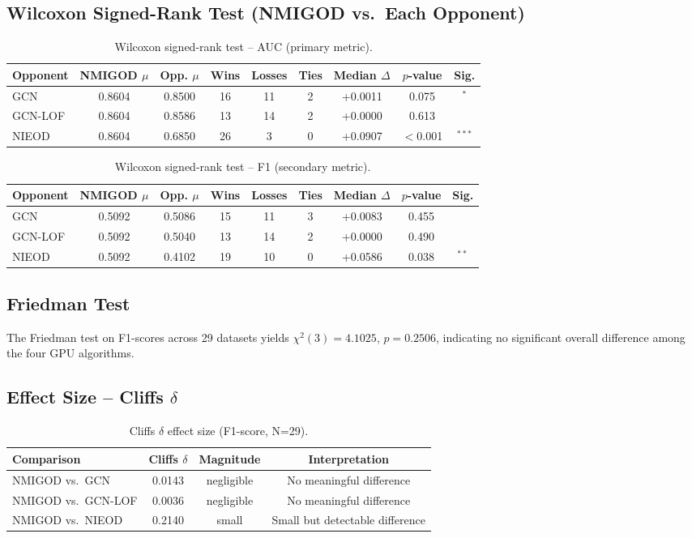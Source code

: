 \documentclass[11pt,a4paper]{article}
\begin{document}
\subsection{Wilcoxon Signed-Rank Test (NMIGOD vs.\ Each Opponent)}
\begin{table}[H]\centering\caption{Wilcoxon signed-rank test -- AUC (primary metric).}\label{tab:wilcoxon_auc}\small
\begin{tabular}{lcccccccc}
\toprule
Opponent & NMIGOD $\mu$ & Opp. $\mu$ & Wins & Losses & Ties & Median $\Delta$ & $p$-value & Sig. \\
\midrule
GCN & 0.8604 & 0.8500 & 16 & 11 & 2 & +0.0011 & 0.075 & $^{*}$ \\
GCN-LOF & 0.8604 & 0.8586 & 13 & 14 & 2 & +0.0000 & 0.613 &  \\
NIEOD & 0.8604 & 0.6850 & 26 & 3 & 0 & +0.0907 & $<$0.001 & $^{***}$ \\
\bottomrule\end{tabular}\end{table}
\begin{table}[H]\centering\caption{Wilcoxon signed-rank test -- F1 (secondary metric).}\label{tab:wilcoxon_f1}\small
\begin{tabular}{lcccccccc}
\toprule
Opponent & NMIGOD $\mu$ & Opp. $\mu$ & Wins & Losses & Ties & Median $\Delta$ & $p$-value & Sig. \\
\midrule
GCN & 0.5092 & 0.5086 & 15 & 11 & 3 & +0.0083 & 0.455 &  \\
GCN-LOF & 0.5092 & 0.5040 & 13 & 14 & 2 & +0.0000 & 0.490 &  \\
NIEOD & 0.5092 & 0.4102 & 19 & 10 & 0 & +0.0586 & 0.038 & $^{**}$ \\
\bottomrule\end{tabular}\end{table}
\subsection{Friedman Test}
The Friedman test on F1-scores across 29 datasets yields $\chi^2(3)=4.1025$, $p=0.2506$, indicating no significant overall difference among the four GPU algorithms.
\subsection{Effect Size -- Cliffs $\delta$}
\begin{table}[H]\centering\caption{Cliffs $\delta$ effect size (F1-score, N=29).}\label{tab:cliff}\small
\begin{tabular}{lccc}
\toprule
Comparison & Cliffs $\delta$ & Magnitude & Interpretation \\
\midrule
NMIGOD vs.\ GCN & 0.0143 & negligible & No meaningful difference \\
NMIGOD vs.\ GCN-LOF & 0.0036 & negligible & No meaningful difference \\
NMIGOD vs.\ NIEOD & 0.2140 & small & Small but detectable difference \\
\bottomrule\end{tabular}\end{table}
\end{document}
